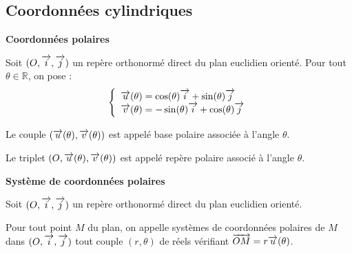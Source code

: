 \documentclass[10pt,oneside]{article}
\begin{document}
\subsection{Coordonnées cylindriques}

\begin{defi}
\textbf{Coordonnées polaires}

Soit $(O,\overrightarrow{i},\overrightarrow{j})$ un repère orthonormé direct du plan euclidien orienté. Pour tout $\theta \in \mathbb{R}$, on pose :
$$
\left\{
\begin{array}{l}
\overrightarrow{u}(\theta)=\cos (\theta) \overrightarrow{i} + \sin (\theta) \overrightarrow{j} \\
\overrightarrow{v}(\theta)=-\sin(\theta) \overrightarrow{i} + \cos (\theta) \overrightarrow{j}
\end{array}
\right.
$$

Le couple $(\overrightarrow{u}(\theta),\overrightarrow{v}(\theta))$ est appelé base polaire associée à l'angle $\theta$. 

Le triplet $(O,\overrightarrow{u}(\theta),\overrightarrow{v}(\theta))$ est appelé repère polaire associé à l'angle $\theta$. 

\end{defi}

\begin{defi}
\textbf{Système de coordonnées polaires}

Soit $(O,\overrightarrow{i},\overrightarrow{j})$ un repère orthonormé direct du plan euclidien orienté. 

Pour tout point $M$ du plan, on appelle systèmes de coordonnées polaires de $M$ dans $(O,\overrightarrow{i},\overrightarrow{j})$ tout couple $(r,\theta)$ de réels vérifiant $\overrightarrow{OM}=r\overrightarrow{u}(\theta)$.

\end{defi}
\end{document}
